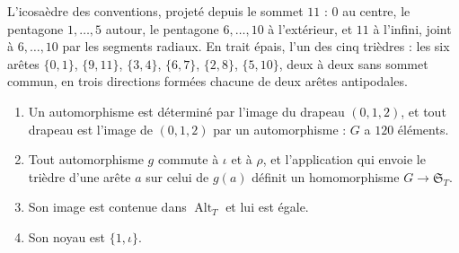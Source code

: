 L'icosaèdre des conventions, projeté depuis le sommet $11$ : $0$ au centre, le pentagone $1, \ldots, 5$ autour, le pentagone $6, \ldots, 10$ à l'extérieur, et $11$ à l'infini, joint à $6, \ldots, 10$ par les segments radiaux. En trait épais, l'un des cinq trièdres : les six arêtes $\{0,1\}$, $\{9,11\}$, $\{3,4\}$, $\{6,7\}$, $\{2,8\}$, $\{5,10\}$, deux à deux sans sommet commun, en trois directions formées chacune de deux arêtes antipodales.
\begin{center}
\end{center}

\begin{encadre}
\begin{theoreme}\leavevmode
\begin{enumerate}
\item Un automorphisme est déterminé par l'image du drapeau $(0, 1, 2)$, et tout drapeau est l'image de $(0, 1, 2)$ par un automorphisme : $G$ a $120$ éléments.
\item Tout automorphisme $g$ commute à $\iota$ et à $\rho$, et l'application qui envoie le trièdre d'une arête $a$ sur celui de $g(a)$ définit un homomorphisme $G \to \mathfrak S_T$.
\item Son image est contenue dans $\operatorname{Alt}_T$ et lui est égale.
\item Son noyau est $\{1, \iota\}$.
\end{enumerate}
\end{theoreme}
\end{encadre}

